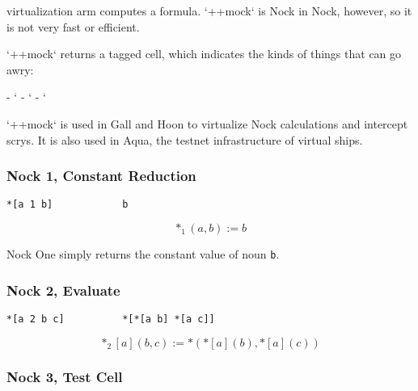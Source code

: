 virtualization arm computes a formula.  `++mock` is Nock in Nock, however, so it is not very fast or efficient.

`++mock` returns a tagged cell, which indicates the kinds of things that can go awry:

- `%
- `%
- `%

`++mock` is used in Gall and Hoon to virtualize Nock calculations and intercept scrys.  It is also used in Aqua, the testnet infrastructure of virtual ships.

\subsubsection[Nock 1]{Nock 1, Constant Reduction}

\begin{lstlisting}[style=nonumbers]
*[a 1 b]            b
\end{lstlisting}

$$
*_{1}(a,b) := b
$$

Nock One simply returns the constant value of noun \texttt{b}.

\subsubsection[Nock 2]{Nock 2, Evaluate}

\begin{lstlisting}[style=nonumbers]
*[a 2 b c]          *[*[a b] *[a c]]
\end{lstlisting}

$$
*_{2}[a](b,c) := *({*[a](b)}, {*[a](c)})
$$

\subsubsection[Nock 3]{Nock 3, Test Cell}


